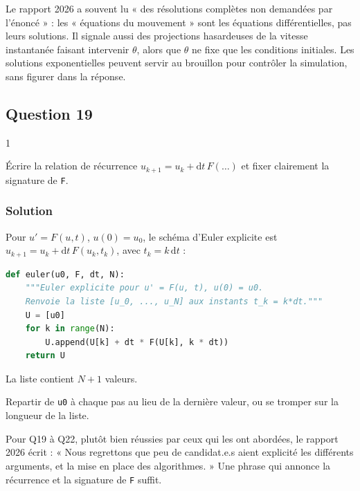 \documentclass[11pt,a4paper]{article}
\begin{document}
\begin{jury}

Le rapport 2026 a souvent lu « des résolutions complètes non demandées par l'énoncé » : les « équations du mouvement » sont les équations différentielles, pas leurs solutions. Il signale aussi des projections hasardeuses de la vitesse instantanée faisant intervenir \(\theta\), alors que \(\theta\) ne fixe que les conditions initiales. Les solutions exponentielles peuvent servir au brouillon pour contrôler la simulation, sans figurer dans la réponse.

\end{jury}

\hypertarget{question-19}{%
\subsection{Question 19}\label{question-19}}

\begin{indication}{1}

Écrire la relation de récurrence \(u_{k+1}=u_k+\mathrm dt\,F(\dots)\) et fixer clairement la signature de \texttt{F}.

\end{indication}

\hypertarget{solution-18}{%
\subsubsection{Solution}\label{solution-18}}

Pour \(u'=F(u,t)\), \(u(0)=u_0\), le schéma d'Euler explicite est \(u_{k+1}=u_k+\mathrm dt\,F(u_k,t_k)\), avec \(t_k=k\,\mathrm dt\) :

\begin{lstlisting}[language=Python]
def euler(u0, F, dt, N):
    """Euler explicite pour u' = F(u, t), u(0) = u0.
    Renvoie la liste [u_0, ..., u_N] aux instants t_k = k*dt."""
    U = [u0]
    for k in range(N):
        U.append(U[k] + dt * F(U[k], k * dt))
    return U
\end{lstlisting}

La liste contient \(N+1\) valeurs.

\begin{piege}

Repartir de \texttt{u0} à chaque pas au lieu de la dernière valeur, ou se tromper sur la longueur de la liste.

\end{piege}

\begin{jury}

Pour Q19 à Q22, plutôt bien réussies par ceux qui les ont abordées, le rapport 2026 écrit : « Nous regrettons que peu de candidat.e.s aient explicité les différents arguments, et la mise en place des algorithmes. » Une phrase qui annonce la récurrence et la signature de \texttt{F} suffit.

\end{jury}
\end{document}
